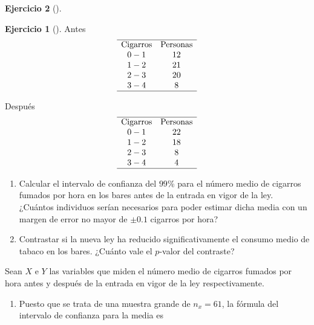 \documentclass[
  a4paper,
]{scrreport}
\theoremstyle{definition}
\newtheorem{exercise}{Ejercicio}[chapter]
\theoremstyle{remark}
\begin{document}
\begin{exercise}[]
\begin{exercise}[]
Antes \[
\begin{array}{cc}
\hline
\mbox{Cigarros} & \mbox{Personas} \\
0-1 & 12\\
1-2 & 21\\
2-3 & 20\\
3-4 & 8\\
\hline
\end{array}
\]

Después \[
\begin{array}{cc}
\hline
\mbox{Cigarros} & \mbox{Personas} \\
0-1 & 22\\
1-2 & 18\\
2-3 & 8\\
3-4 & 4\\
\hline
\end{array}
\]

\begin{enumerate}
\def\labelenumi{\alph{enumi}.}
\item
  Calcular el intervalo de confianza del \(99\)\% para el número medio
  de cigarros fumados por hora en los bares antes de la entrada en vigor
  de la ley. ¿Cuántos individuos serían necesarios para poder estimar
  dicha media con un margen de error no mayor de \(\pm 0.1\) cigarros
  por hora?
\item
  Contrastar si la nueva ley ha reducido significativamente el consumo
  medio de tabaco en los bares. ¿Cuánto vale el \(p\)-valor del
  contraste?
\end{enumerate}

\end{exercise}

\begin{tcolorbox}[enhanced jigsaw, leftrule=.75mm, colbacktitle=quarto-callout-tip-color!10!white, opacityback=0, colback=white, toprule=.15mm, colframe=quarto-callout-tip-color-frame, coltitle=black, left=2mm, title=\textcolor{quarto-callout-tip-color}{\faLightbulb}\hspace{0.5em}{Solución}, breakable, bottomtitle=1mm, bottomrule=.15mm, opacitybacktitle=0.6, toptitle=1mm, arc=.35mm, titlerule=0mm, rightrule=.15mm]

Sean \(X\) e \(Y\) las variables que miden el número medio de cigarros
fumados por hora antes y después de la entrada en vigor de la ley
respectivamente.

\begin{enumerate}
\def\labelenumi{\alph{enumi}.}
\item
  Puesto que se trata de una muestra grande de \(n_x=61\), la fórmula
  del intervalo de confianza para la media es


\end{enumerate}
\end{tcolorbox}
\end{exercise}
\end{document}

